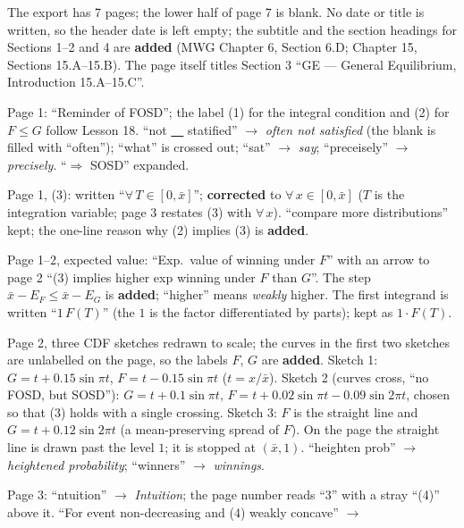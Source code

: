 \documentclass[11pt]{article}
\begin{document}
\begin{transcriptnotes}
  \item The export has 7 pages; the lower half of page 7 is blank. No date or title is
        written, so the header date is left empty; the subtitle and the section headings
        for Sections 1--2 and 4 are \textbf{added} (MWG Chapter 6, Section 6.D;
        Chapter 15, Sections 15.A--15.B). The page itself titles Section 3 ``GE ---
        General Equilibrium, Introduction 15.A--15.C''.
  \item Page 1: ``Reminder of FOSD''; the label (1) for the integral condition and (2)
        for $F\le G$ follow Lesson 18. ``not \underline{\ \ } statified'' $\to$
        \emph{often not satisfied} (the blank is filled with ``often'');
        ``what'' is crossed out; ``sat'' $\to$ \emph{say}; ``preceisely'' $\to$
        \emph{precisely}. ``$\Rightarrow$ SOSD'' expanded.
  \item Page 1, (3): written ``$\forall\,T\in[0,\bar x]$''; \textbf{corrected} to
        $\forall\,x\in[0,\bar x]$ ($T$ is the integration variable; page 3 restates (3)
        with $\forall\,x$). ``compare more distributions'' kept; the one-line reason why
        (2) implies (3) is \textbf{added}.
  \item Page 1--2, expected value: ``Exp.\ value of winning under $F$'' with an arrow to
        page 2 ``(3) implies higher exp winning under $F$ than $G$''. The step
        $\bar x-E_F\le\bar x-E_G$ is \textbf{added}; ``higher'' means \emph{weakly}
        higher. The first integrand is written ``$1\,F(T)$'' (the $1$ is the factor
        differentiated by parts); kept as $1\cdot F(T)$.
  \item Page 2, three CDF sketches redrawn to scale; the curves in the first two
        sketches are unlabelled on the page, so the labels $F$, $G$ are \textbf{added}.
        Sketch 1: $G=t+0.15\sin\pi t$, $F=t-0.15\sin\pi t$ ($t=x/\bar x$). Sketch 2
        (curves cross, ``no FOSD, but SOSD''): $G=t+0.1\sin\pi t$,
        $F=t+0.02\sin\pi t-0.09\sin2\pi t$, chosen so that (3) holds with a single
        crossing. Sketch 3: $F$ is the straight line and $G=t+0.12\sin2\pi t$ (a
        mean-preserving spread of $F$). On the page the straight line is drawn past the
        level $1$; it is stopped at $(\bar x,1)$. ``heighten prob'' $\to$
        \emph{heightened probability}; ``winners'' $\to$ \emph{winnings}.
  \item Page 3: ``ntuition'' $\to$ \emph{Intuition}; the page number reads ``3'' with a
        stray ``(4)'' above it. ``For event non-decreasing and (4) weakly concave'' $\to$

\end{transcriptnotes}
\end{document}
